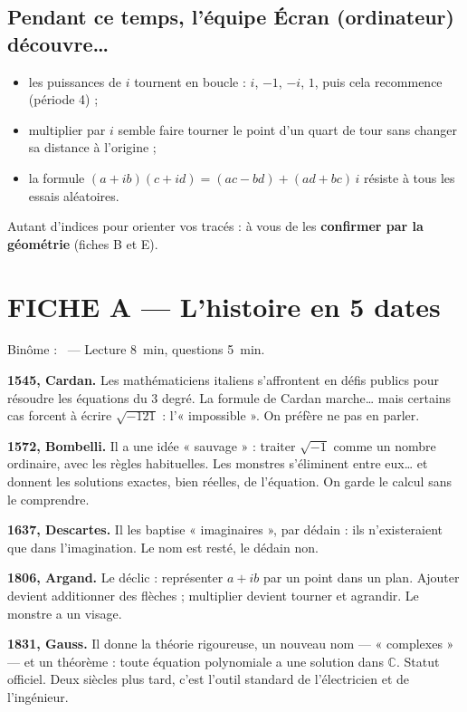 \documentclass[11pt,a4paper]{article}
\newcommand{\pointilles}{\makebox[3.5cm]{\dotfill}}
\begin{document}
\subsection*{Pendant ce temps, l'équipe Écran (ordinateur) découvre\dots}

\begin{itemize}
  \item les puissances de $i$ tournent en boucle : $i$, $-1$, $-i$, $1$, puis
        cela recommence (période 4) ;
  \item multiplier par $i$ semble faire tourner le point d'un quart de tour sans
        changer sa distance à l'origine ;
  \item la formule $(a + ib)(c + id) = (ac - bd) + (ad + bc)\,i$ résiste à
        tous les essais aléatoires.
\end{itemize}

Autant d'indices pour orienter vos tracés : à vous de les \textbf{confirmer par
la géométrie} (fiches B et E).

\newpage
\section*{FICHE A --- L'histoire en 5 dates}

Binôme : \pointilles\ --- Lecture 8~min, questions 5~min.

\textbf{1545, Cardan.} Les mathématiciens italiens s'affrontent en défis
publics pour résoudre les équations du 3 degré. La formule de Cardan
marche\dots{} mais certains cas forcent à écrire $\sqrt{-121}$ :
l'« impossible ». On préfère ne pas en parler.

\textbf{1572, Bombelli.} Il a une idée « sauvage » : traiter $\sqrt{-1}$
comme un nombre ordinaire, avec les règles habituelles. Les monstres
s'éliminent entre eux\dots{} et donnent les solutions exactes, bien réelles,
de l'équation. On garde le calcul sans le comprendre.

\textbf{1637, Descartes.} Il les baptise « imaginaires », par dédain : ils
n'existeraient que dans l'imagination. Le nom est resté, le dédain non.

\textbf{1806, Argand.} Le déclic : représenter $a + ib$ par un point dans un
plan. Ajouter devient additionner des flèches ; multiplier devient tourner et
agrandir. Le monstre a un visage.

\textbf{1831, Gauss.} Il donne la théorie rigoureuse, un nouveau nom ---
« complexes » --- et un théorème : toute équation polynomiale a une solution
dans $\mathbb{C}$. Statut officiel. Deux siècles plus tard, c'est l'outil
standard de l'électricien et de l'ingénieur.
\end{document}
